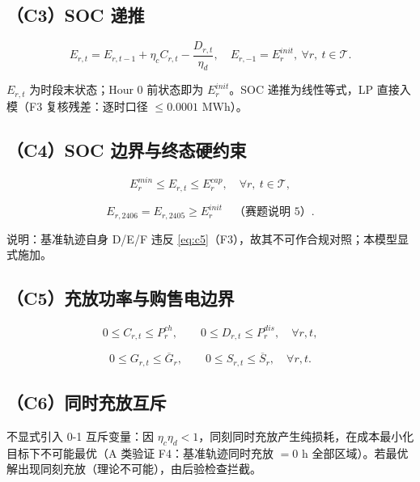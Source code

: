 \documentclass{internal-report}
\begin{document}
\subsection{（C3）SOC 递推}

\begin{equation}
  E_{r,t} = E_{r,t-1} + \eta_c C_{r,t} - \frac{D_{r,t}}{\eta_d},\quad
  E_{r,-1} = E^{init}_r,\ \forall r,\ t\in\mathcal{T}.
  \label{eq:c3}
\end{equation}

$E_{r,t}$ 为时段末状态；Hour 0 前状态即为 $E^{init}_r$。SOC 递推为线性等式，LP 直接入模（F3 复核残差：逐时口径 $\le 0.0001$ MWh）。

\subsection{（C4）SOC 边界与终态硬约束}

\begin{equation}
  E^{min}_r \le E_{r,t} \le E^{cap}_r,\quad \forall r,\ t\in\mathcal{T},
  \label{eq:c4}
\end{equation}

\begin{equation}
  E_{r,2406} = E_{r,2405} \ge E^{init}_r\quad\text{（赛题说明 5）}.
  \label{eq:c5}
\end{equation}

说明：基准轨迹自身 D/E/F 违反 \eqref{eq:c5}（F3），故其不可作合规对照；本模型显式施加。

\subsection{（C5）充放功率与购售电边界}

\begin{equation}
  0 \le C_{r,t} \le P^{ch}_r,\qquad 0 \le D_{r,t} \le P^{dis}_r,\quad \forall r,t,
  \label{eq:c6}
\end{equation}

\begin{equation}
  0 \le G_{r,t} \le \overline{G}_r,\qquad 0 \le S_{r,t} \le \overline{S}_r,\quad \forall r,t.
  \label{eq:c7}
\end{equation}

\subsection{（C6）同时充放互斥}

不显式引入 0-1 互斥变量：因 $\eta_c\eta_d<1$，同刻同时充放产生纯损耗，在成本最小化目标下不可能最优（A 类验证 F4：基准轨迹同时充放 $=0$ h 全部区域）。若最优解出现同刻充放（理论不可能），由后验检查拦截。
\end{document}
